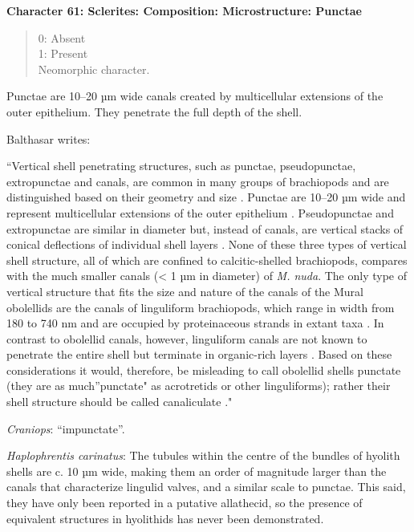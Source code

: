 \documentclass[openany]{book}
\theoremstyle{definition}
\theoremstyle{definition}
\theoremstyle{definition}
\theoremstyle{remark}
\begin{document}
\textbf{Character 61: Sclerites: Composition: Microstructure: Punctae}

\begin{quote}
0: Absent\\
1: Present\\
Neomorphic character.
\end{quote}

Punctae are 10--20 µm wide canals created by multicellular extensions of
the outer epithelium. They penetrate the full depth of the shell.

Balthasar \citeyearpar{Balthasar2008iMummpikia} writes:

``Vertical shell penetrating structures, such as punctae, pseudopunctae,
extropunctae and canals, are common in many groups of brachiopods and
are distinguished based on their geometry and size
\citep{Williams1997Introduction}. Punctae are 10--20 µm wide and
represent multicellular extensions of the outer epithelium
\citep{Owen1969Thecaecum}. Pseudopunctae and extropunctae are similar in
diameter but, instead of canals, are vertical stacks of conical
deflections of individual shell layers \citep{Williams1993Roleof}. None
of these three types of vertical shell structure, all of which are
confined to calcitic-shelled brachiopods, compares with the much smaller
canals (\textless{} 1 µm in diameter) of \emph{M. nuda}. The only type
of vertical structure that fits the size and nature of the canals of the
Mural obolellids are the canals of linguliform brachiopods, which range
in width from 180 to 740 nm and are occupied by proteinaceous strands in
extant taxa
\citep{Williams1992Structureof, Williams1994Collagenouschitino, Williams1997Introduction}.
In contrast to obolellid canals, however, linguliform canals are not
known to penetrate the entire shell but terminate in organic-rich layers
\citep{Williams1997Introduction}. Based on these considerations it
would, therefore, be misleading to call obolellid shells punctate (they
are as much''punctate" as acrotretids or other linguliforms); rather
their shell structure should be called canaliculate
\citep{Williams1997Introduction}."

\hypertarget{Craniops-coding-61}{}
\emph{Craniops}: ``impunctate''.

\hypertarget{Haplophrentis_carinatus-coding-61}{}
\emph{Haplophrentis carinatus}: The tubules within the centre of the
bundles of hyolith shells \citep{Kouchinsky2000Skeletalmicrostructures}
are c. 10 µm wide, making them an order of magnitude larger than the
canals that characterize lingulid valves, and a similar scale to
punctae. This said, they have only been reported in a putative
allathecid, so the presence of equivalent structures in hyolithids has
never been demonstrated.
\end{document}
